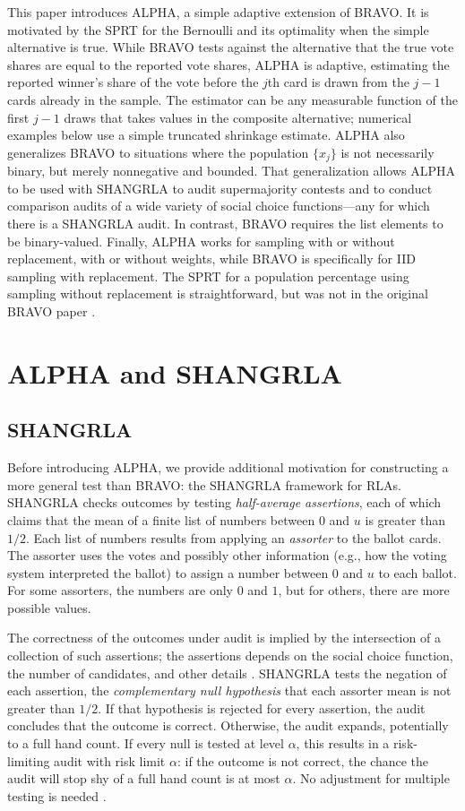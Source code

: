 \documentclass[aoas]{imsart}
\begin{document}
This paper introduces ALPHA, a simple adaptive extension of BRAVO.
It is motivated by the SPRT for the Bernoulli and its optimality when the simple alternative is true.
While BRAVO tests against the alternative that the true vote shares are equal to the reported vote shares,
ALPHA is adaptive, estimating the reported winner's share of the vote before the $j$th card is drawn
from the $j-1$ cards already in the sample.
The estimator can be any measurable function of the first $j-1$ draws that takes values in the composite alternative; 
numerical examples below use a simple truncated shrinkage estimate. 
ALPHA also generalizes BRAVO to situations where the population $\{x_j\}$ is not necessarily binary, 
but merely nonnegative and bounded.
That generalization allows ALPHA to be used with SHANGRLA to audit supermajority contests
and to conduct comparison audits of a wide variety of social choice functions---any for which there is a
SHANGRLA audit.
In contrast, BRAVO requires the list elements to be binary-valued.
Finally, ALPHA works for sampling with or without replacement, with or without weights, while BRAVO is specifically for 
IID sampling with replacement.
The SPRT for a population percentage using sampling without replacement is straightforward, but was not
in the original BRAVO paper \citep{lindemanEtal12}.

\section{ALPHA and SHANGRLA}

\subsection{SHANGRLA} \label{sec:shangrla}
Before introducing ALPHA, we provide additional motivation for constructing a more general test than BRAVO: 
the SHANGRLA framework for RLAs.
SHANGRLA \citep{stark20} checks outcomes by testing \emph{half-average assertions}, each of which claims 
that the mean of a finite list of
numbers between $0$ and $u$ is greater than $1/2$.
Each list of numbers results from applying an \emph{assorter} to the ballot cards.
The assorter uses the votes and possibly other information (e.g., how the voting system interpreted the ballot)
to assign a number between $0$ and $u$ to each ballot.
For some assorters, the numbers are only $0$ and $1$, but for others, there are more possible values.

The correctness of the outcomes under audit is implied by the intersection of a collection of such assertions;
the assertions depends on the social choice function, the number of candidates, and other details \citep{stark20}.
SHANGRLA tests the negation of each assertion, the
\emph{complementary null hypothesis} that each assorter mean is not greater than $1/2$.
If that hypothesis is rejected for every assertion,
the audit concludes that the outcome is correct.
Otherwise, the audit expands, potentially to a full hand count.
If every null is tested at level $\alpha$, this results in a risk-limiting
audit with risk limit $\alpha$: if the outcome is not correct, the chance the audit will stop
shy of a full hand count is at most $\alpha$.
No adjustment for multiple testing is needed \citep{stark20}.
\end{document}
